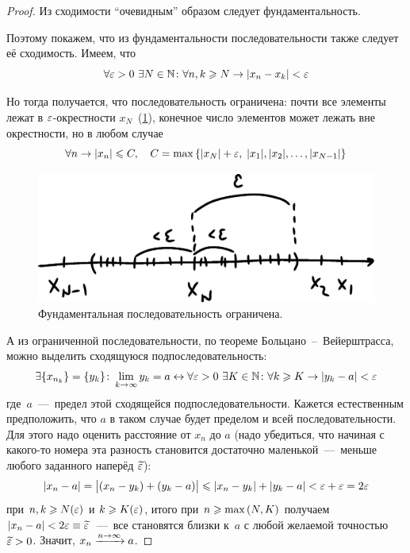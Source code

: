 \documentclass[a4paper,12pt]{article}
\begin{document}
  \begin{proof}
    Из сходимости ``очевидным'' образом следует фундаментальность.
    
    Поэтому покажем, что из фундаментальности последовательности также следует её сходимость.
    Имеем, что
    \[
      \forall \varepsilon > 0\ \exists N \in \mathbb N\colon \forall n, k \geqslant N \to |x_n - x_k| < \varepsilon
    \]
    
    Но тогда получается, что последовательность ограничена: почти все элементы лежат в $\varepsilon$-окрестности $x_N$~(\ref{fig:all-near-xN}), конечное число элементов может лежать вне окрестности, но в любом случае  %
    \[
      \forall n \to |x_n| \leqslant C,\quad C = \max\left\{|x_N| + \varepsilon,\; |x_1|, |x_2|, \ldots, |x_{N - 1}|\right\}
    \]
    
    \begin{figure}[ht]
      \centering
      \includegraphics[width=0.6\linewidth]{images/all-near-xN}
      
      \caption{
        Фундаментальная последовательность ограничена.
      }
      \label{fig:all-near-xN}
    \end{figure}
    
    А из ограниченной последовательности, по теореме Больцано~--~Вейерштрасса, можно выделить сходящуюся подпоследовательность:
    \begin{equation}
    \begin{split}
      \exists \{x_{n_k}\} = \{y_k\}\colon \lim_{k \to \infty} y_k = a
        \leftrightarrow \forall \varepsilon > 0\ \exists K \in \mathbb N\colon \forall k \geqslant K \to |y_k - a| < \varepsilon
    \end{split}
    \end{equation}
    где~$a$~---~предел этой сходящейся подпоследовательности.
    Кажется естественным предположить, что $a$ в таком случае будет пределом и всей последовательности.
    Для этого надо оценить расстояние от $x_n$ до $a$ (надо убедиться, что начиная с какого-то номера эта разность становится достаточно маленькой~---~меньше любого заданного наперёд $\widetilde {\varepsilon}$):
    \[
      |x_n - a| = \bigl|(x_n - y_k) + (y_k - a)\bigr|
        \leqslant |x_n - y_k| + |y_k - a| < \varepsilon + \varepsilon = 2\varepsilon
    \]
    при $n, k \geqslant N(\varepsilon)$ и $k \hm\geq K(\eps)$, итого при $n \hm\geq \max{(N, K)}$ получаем $|x_n \hm- a| \hm< 2\eps \equiv \widetilde \eps$~---~все становятся близки к~$a$ с любой желаемой точностью~$\widetilde \eps \hm> 0$.
    Значит, $x_n \hm{\xrightarrow{n \to \infty}} a$.
  \end{proof}
  
\end{document}
